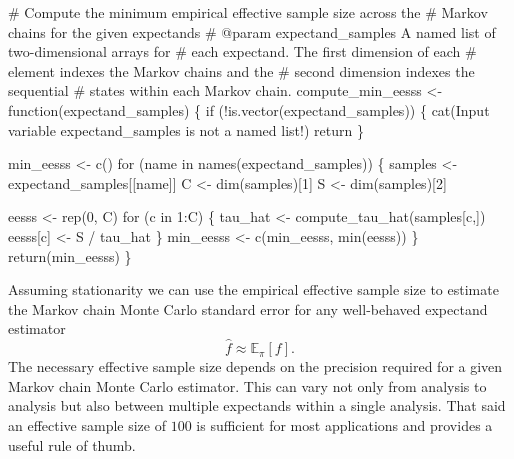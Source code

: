 \documentclass[
  letterpaper,
  DIV=11,
  numbers=noendperiod]{scrartcl}
\newenvironment{Shaded}{\begin{snugshade}}{\end{snugshade}}
\newcommand{\CommentTok}[1]{\textcolor[rgb]{0.37,0.37,0.37}{#1}}
\newcommand{\ControlFlowTok}[1]{\textcolor[rgb]{0.00,0.23,0.31}{#1}}
\newcommand{\DecValTok}[1]{\textcolor[rgb]{0.68,0.00,0.00}{#1}}
\newcommand{\FunctionTok}[1]{\textcolor[rgb]{0.28,0.35,0.67}{#1}}
\newcommand{\NormalTok}[1]{\textcolor[rgb]{0.00,0.23,0.31}{#1}}
\newcommand{\OtherTok}[1]{\textcolor[rgb]{0.00,0.23,0.31}{#1}}
\newcommand{\SpecialCharTok}[1]{\textcolor[rgb]{0.37,0.37,0.37}{#1}}
\newcommand{\StringTok}[1]{\textcolor[rgb]{0.13,0.47,0.30}{#1}}
\begin{document}
\begin{Shaded}
\begin{Highlighting}[]
\CommentTok{\# Compute the minimum empirical effective sample size across the }
\CommentTok{\# Markov chains for the given expectands}
\CommentTok{\# @param expectand\_samples A named list of two{-}dimensional arrays for }
\CommentTok{\#                          each expectand.  The first dimension of each}
\CommentTok{\#                          element indexes the Markov chains and the }
\CommentTok{\#                          second dimension indexes the sequential }
\CommentTok{\#                          states within each Markov chain.}
\NormalTok{compute\_min\_eesss }\OtherTok{\textless{}{-}} \ControlFlowTok{function}\NormalTok{(expectand\_samples) \{}
  \ControlFlowTok{if}\NormalTok{ (}\SpecialCharTok{!}\FunctionTok{is.vector}\NormalTok{(expectand\_samples)) \{}
    \FunctionTok{cat}\NormalTok{(}\StringTok{\textquotesingle{}Input variable \textasciigrave{}expectand\_samples\textasciigrave{} is not a named list!\textquotesingle{}}\NormalTok{)}
\NormalTok{    return}
\NormalTok{  \}}

\NormalTok{  min\_eesss }\OtherTok{\textless{}{-}} \FunctionTok{c}\NormalTok{()}
  \ControlFlowTok{for}\NormalTok{ (name }\ControlFlowTok{in} \FunctionTok{names}\NormalTok{(expectand\_samples)) \{}
\NormalTok{    samples }\OtherTok{\textless{}{-}}\NormalTok{ expectand\_samples[[name]]}
\NormalTok{    C }\OtherTok{\textless{}{-}} \FunctionTok{dim}\NormalTok{(samples)[}\DecValTok{1}\NormalTok{]}
\NormalTok{    S }\OtherTok{\textless{}{-}} \FunctionTok{dim}\NormalTok{(samples)[}\DecValTok{2}\NormalTok{]}
    
\NormalTok{    eesss }\OtherTok{\textless{}{-}} \FunctionTok{rep}\NormalTok{(}\DecValTok{0}\NormalTok{, C)}
    \ControlFlowTok{for}\NormalTok{ (c }\ControlFlowTok{in} \DecValTok{1}\SpecialCharTok{:}\NormalTok{C) \{}
\NormalTok{      tau\_hat }\OtherTok{\textless{}{-}} \FunctionTok{compute\_tau\_hat}\NormalTok{(samples[c,])}
\NormalTok{      eesss[c] }\OtherTok{\textless{}{-}}\NormalTok{ S }\SpecialCharTok{/}\NormalTok{ tau\_hat}
\NormalTok{    \}}
\NormalTok{    min\_eesss }\OtherTok{\textless{}{-}} \FunctionTok{c}\NormalTok{(min\_eesss, }\FunctionTok{min}\NormalTok{(eesss))}
\NormalTok{  \}}
  \FunctionTok{return}\NormalTok{(min\_eesss)}
\NormalTok{\}}
\end{Highlighting}
\end{Shaded}

Assuming stationarity we can use the empirical effective sample size to
estimate the Markov chain Monte Carlo standard error for any
well-behaved expectand estimator \[
\hat{f} \approx \mathbb{E}_{\pi}[f].
\] The necessary effective sample size depends on the precision required
for a given Markov chain Monte Carlo estimator. This can vary not only
from analysis to analysis but also between multiple expectands within a
single analysis. That said an effective sample size of \(100\) is
sufficient for most applications and provides a useful rule of thumb.
\end{document}
